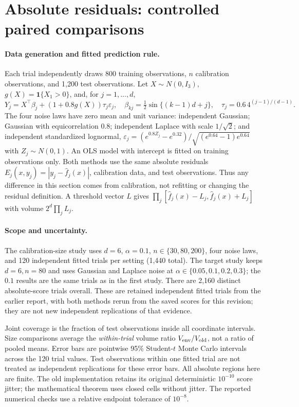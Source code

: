 \section{Absolute residuals: controlled paired comparisons}
\label{sec:absolute}

\paragraph{Data generation and fitted prediction rule.}
Each trial independently draws 800 training observations, $n$ calibration
observations, and 1,200 test observations. Let $X\sim N(0,I_3)$,
$g(X)=\mathbf 1\{X_1>0\}$, and, for $j=1,\ldots,d$,
\begin{equation}\label{eq:toy-model}
 Y_j=X^\top\beta_j+(1+0.8g(X))\tau_j\varepsilon_j,
 \quad \beta_{kj}=\tfrac12\sin\{(k-1)d+j\},\quad
 \tau_j=0.6\,4^{(j-1)/(d-1)}.
\end{equation}
The four noise laws have zero mean and unit variance: independent Gaussian;
Gaussian with equicorrelation $0.8$; independent Laplace with scale
$1/\sqrt2$; and independent standardized lognormal,
$\varepsilon_j=(e^{0.8Z_j}-e^{0.32})/
\sqrt{(e^{0.64}-1)e^{0.64}}$ with $Z_j\sim N(0,1)$.
An OLS model with intercept is fitted on training observations only. Both
methods use the same absolute residuals
$E_j(x,y_j)=|y_j-\widehat f_j(x)|$, calibration data, and test observations.
Thus any difference in this section comes from calibration, not refitting
or changing the residual definition. A threshold vector $L$ gives
$\prod_j[\widehat f_j(x)-L_j,\widehat f_j(x)+L_j]$ with volume
$2^d\prod_jL_j$.

\paragraph{Scope and uncertainty.}
The calibration-size study uses $d=6$, $\alpha=0.1$, $n\in\{30,80,200\}$,
four noise laws, and 120 independent fitted trials per setting (1,440 total).
The target study keeps $d=6,n=80$ and uses Gaussian and Laplace noise at
$\alpha\in\{0.05,0.1,0.2,0.3\}$; the $0.1$ results are the same trials as
in the first study. There are 2,160 distinct absolute-score trials overall.
These are retained independent fitted trials from the earlier report, with
both methods rerun from the saved scores for this revision; they are not
new independent replications of that evidence.

Joint coverage is the fraction of test observations inside all coordinate
intervals. Size comparisons average the \emph{within-trial} volume ratio
$V_{\rm env}/V_{\rm old}$, not a ratio of pooled means. Error bars are
pointwise 95\% Student-$t$ Monte Carlo intervals across the 120 trial values.
Test observations within one fitted trial are not treated as independent
replications for these error bars. All absolute regions here are finite.
The old implementation retains its original deterministic $10^{-10}$ score
jitter; the mathematical theorem uses closed cells without jitter. The
reported numerical checks use a relative endpoint tolerance of $10^{-8}$.

